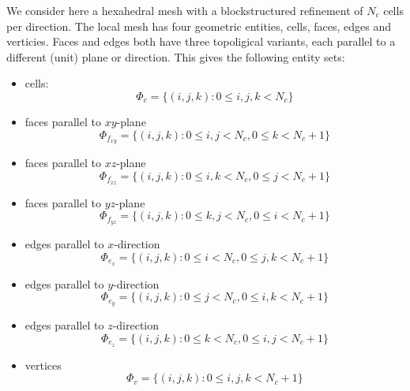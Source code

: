 \documentclass[a4paper,11pt]{article}
\begin{document}
We consider here a hexahedral mesh with a blockstructured refinement of $N_c$
cells per direction. The local mesh has four geometric entities, cells, faces,
edges and verticies. Faces and edges both have three topoligical variants, each
parallel to a different (unit) plane or direction. This gives the following
entity sets:
\begin{itemize}
\item cells:
  \begin{equation}
    \label{eq:block-es-cell}
    \Phi_c = \{ (i,j,k) \colon 0 \le i, j, k < N_c \}
  \end{equation}
\item faces parallel to $xy$-plane
  \begin{equation}
    \label{eq:block-es-fxy}
    \Phi_{f_{xy}} = \{ (i,j,k) \colon 0 \le i,j < N_c, 0 \le k < N_c + 1 \}
  \end{equation}
\item faces parallel to $xz$-plane
  \begin{equation}
    \label{eq:block-es-fxz}
    \Phi_{f_{xz}} = \{ (i,j,k) \colon 0 \le i,k < N_c, 0 \le j < N_c + 1 \}
  \end{equation}
\item faces parallel to $yz$-plane
  \begin{equation}
    \label{eq:block-es-fyz}
    \Phi_{f_{yz}} = \{ (i,j,k) \colon 0 \le k,j < N_c, 0 \le i < N_c + 1 \}
  \end{equation}
\item edges parallel to $x$-direction
  \begin{equation}
    \label{eq:block-es-ex}
    \Phi_{e_x} = \{ (i,j,k) \colon 0 \le i < N_c, 0 \le j,k < N_c + 1 \}
  \end{equation}
\item edges parallel to $y$-direction
  \begin{equation}
    \label{eq:block-es-ey}
    \Phi_{e_y} = \{ (i,j,k) \colon 0 \le j < N_c, 0 \le i,k < N_c + 1 \}
  \end{equation}
\item edges parallel to $z$-direction
  \begin{equation}
    \label{eq:block-es-ez}
    \Phi_{e_z} = \{ (i,j,k) \colon 0 \le k < N_c, 0 \le i,j < N_c + 1 \}
  \end{equation}
\item vertices
  \begin{equation}
    \label{eq:block-es-v}
    \Phi_v = \{ (i,j,k) \colon 0 \le i, j, k < N_c + 1 \}
  \end{equation}
\end{itemize}
\end{document}
